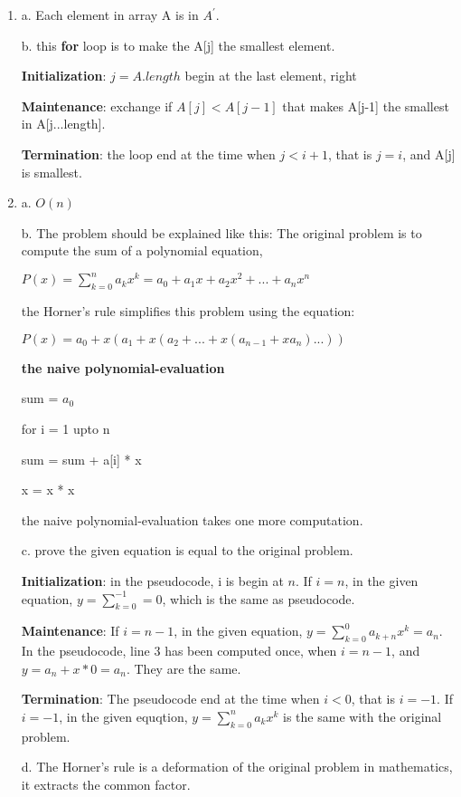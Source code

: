 \documentclass{article}
\begin{document}
\begin{enumerate}[\textbf{2-}1]
\item
\par a. Each element in array A is in $A^{'}$.
\par b. this \textbf{for} loop is to make the A[j] the smallest element.
\par \textbf{Initialization}: $j=A.length$ begin at the last element, right
\par \textbf{Maintenance}: exchange if $A[j]<A[j-1]$ that makes A[j-1] the smallest in A[j...length].
\par \textbf{Termination}: the loop end at the time when $j<i+1$, that is $j=i$, and A[j] is smallest.
\item 
\par a. $O(n)$
\par b. The problem should be explained like this: The original problem is to compute the sum of a polynomial equation, 
\par $P(x) = \displaystyle{\sum_{k=0}^{n} a_{k}x^{k} = a_0 + a_1x +a_2x^2+...+a_nx^n}$
\par the Horner's rule simplifies this problem using the equation:
\par $P(x)= a_0 +x(a_1+x(a_2+...+x(a_{n-1}+xa_n)...))$
\par \textbf{the naive polynomial-evaluation}
\par sum = $a_0$
\par for i = 1 upto n
\par \quad sum = sum + a[i] * x
\par \quad x = x * x
\par the naive polynomial-evaluation takes one more computation.
\par c. prove the given equation is equal to the original problem.
\par \textbf{Initialization}: in the pseudocode, i is begin at $n$. If $i=n$, in the given equation, $y=\displaystyle{\sum_{k=0}^{-1}}=0$, which is the same as pseudocode.
\par \textbf{Maintenance}: If $i=n-1$, in the given equation, $y=\displaystyle{\sum_{k=0}^0a_{k+n}x^k}=a_n$. In the pseudocode, line 3 has been computed once, when $i=n-1$, and $y= a_n +x*0=a_n$. They are the same.
\par \textbf{Termination}: The pseudocode end at the time when $i<0$, that is $i=-1$. If $i=-1$, in the given equqtion, $y=\displaystyle{\sum_{k=0}^{n}a_{k}x^k}$ is the same with the original problem.
\par d. The Horner's rule is a deformation of the original problem in mathematics, it extracts the common factor.

\end{enumerate}
\end{document}
